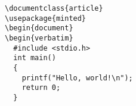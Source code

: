 \documentclass[varwidth,crop]{standalone}
\begin{document}
\begin{verbatim}
\documentclass{article}
\usepackage{minted}
\begin{document}
\begin{verbatim}
  #include <stdio.h>
  int main()
  {
    printf("Hello, world!\n");
    return 0;
  }
\end{verbatim}
\end{document}
